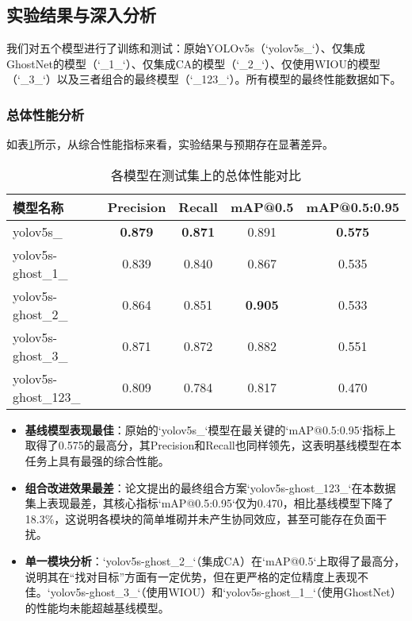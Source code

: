 \documentclass[a4paper]{ctexart}
\begin{document}
\subsection{实验结果与深入分析}
我们对五个模型进行了训练和测试：原始YOLOv5s（`yolov5s_`）、仅集成GhostNet的模型（`_1_`）、仅集成CA的模型（`_2_`）、仅使用WIOU的模型（`_3_`）以及三者组合的最终模型（`_123_`）。所有模型的最终性能数据如下。

\subsubsection{总体性能分析}
如表\ref{tab:overall-performance}所示，从综合性能指标来看，实验结果与预期存在显著差异。

\begin{table}[H]
    \centering
    \caption{各模型在测试集上的总体性能对比}
    \label{tab:overall-performance}
    \begin{tabular}{lcccc}
        \toprule
        \textbf{模型名称} & \textbf{Precision} & \textbf{Recall} & \textbf{mAP@0.5} & \textbf{mAP@0.5:0.95} \\
        \midrule
        yolov5s\_             & \textbf{0.879} & \textbf{0.871} & 0.891          & \textbf{0.575} \\
        yolov5s-ghost\_1\_    & 0.839          & 0.840          & 0.867          & 0.535          \\
        yolov5s-ghost\_2\_    & 0.864          & 0.851          & \textbf{0.905} & 0.533          \\
        yolov5s-ghost\_3\_    & 0.871          & 0.872          & 0.882          & 0.551          \\
        yolov5s-ghost\_123\_  & 0.809          & 0.784          & 0.817          & 0.470          \\
        \bottomrule
    \end{tabular}
\end{table}

\begin{itemize}
    \item \textbf{基线模型表现最佳}：原始的`yolov5s_`模型在最关键的`mAP@0.5:0.95`指标上取得了0.575的最高分，其Precision和Recall也同样领先，这表明基线模型在本任务上具有最强的综合性能。
    \item \textbf{组合改进效果最差}：论文提出的最终组合方案`yolov5s-ghost_123_`在本数据集上表现最差，其核心指标`mAP@0.5:0.95`仅为0.470，相比基线模型下降了18.3\%，这说明各模块的简单堆砌并未产生协同效应，甚至可能存在负面干扰。
    \item \textbf{单一模块分析}：`yolov5s-ghost_2_`（集成CA）在`mAP@0.5`上取得了最高分，说明其在“找对目标”方面有一定优势，但在更严格的定位精度上表现不佳。`yolov5s-ghost_3_`（使用WIOU）和`yolov5s-ghost_1_`（使用GhostNet）的性能均未能超越基线模型。
\end{itemize}
\end{document}
